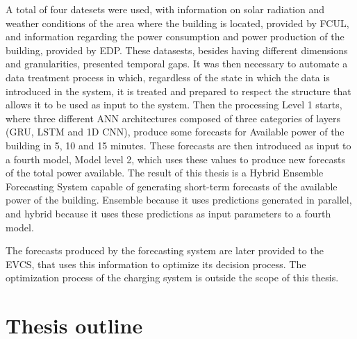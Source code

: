 A total of four datesets were used, with information on solar radiation and weather conditions of the area where the building is located, provided by \ac{FCUL}, and information regarding the power consumption and power production of the building, provided by \ac{EDP}. These datasests, besides having different dimensions and granularities, presented temporal gaps. It was then necessary to automate a data treatment process in which, regardless of the state in which the data is introduced in the system, it is treated and prepared to respect the structure that allows it to be used as input to the system. Then the processing Level 1 starts, where three different \ac{ANN} architectures composed of three categories of layers (\ac{GRU}, \ac{LSTM} and \ac{1D CNN}), produce some forecasts for Available power of the building in 5, 10 and 15 minutes. These forecasts are then introduced as input to a fourth model, Model level 2, which uses these values to produce new forecasts of the total power available. The result of this thesis is a Hybrid Ensemble Forecasting System capable of generating short-term forecasts of the available power of the building. Ensemble because it uses predictions generated in parallel, and hybrid because it uses these predictions as input parameters to a fourth model. 

The forecasts produced by the forecasting system are later provided to the \ac{EVCS}, that uses this information to optimize its decision process. The optimization process of the charging system is outside the scope of this thesis.

\section{Thesis outline}